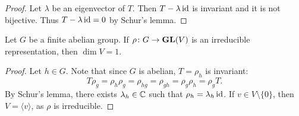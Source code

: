 \begin{proof}
    Let $\lambda$ be an eigenvector of $T$. Then $T-\lambda\operatorname{id}$ is invariant and it is 
    not bijective. Thus $T-\lambda\operatorname{id}=0$ by Schur's lemma.
\end{proof}

\begin{proposition}
    Let $G$ be a finite abelian group. If $\rho\colon G\to\mathbf{GL}(V)$ is an irreducible representation, then
    $\dim V=1$. 
\end{proposition}

\begin{proof}
    Let $h\in G$. Note that since $G$ is abelian, $T=\rho_h$ is invariant:
    \[
    T\rho_g=\rho_h\rho_g=\rho_{hg}=\rho_{gh}=\rho_g\rho_h=\rho_gT.
    \]
    By Schur's lemma, there exists $\lambda_h\in\mathbb{C}$ such that $\rho_h=\lambda_h\operatorname{id}$. If $v\in V\setminus\{0\}$, 
    then $V=\langle v\rangle$, as $\rho$ is irreducible. 
\end{proof}
